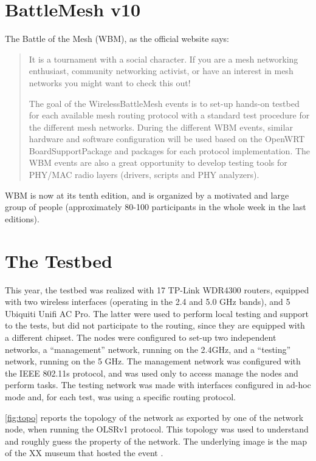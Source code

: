 \documentclass[10pt,onecolumn]{paper}
\begin{document}
\section{BattleMesh v10}
The Battle of the Mesh (WBM), as the official website says:
\begin{quote}
It is a tournament with a social character. If you are a mesh networking
enthusiast, community networking activist, or have an interest in mesh networks
you might want to check this out!

The goal of the WirelessBattleMesh events is to set-up hands-on testbed for each
available mesh routing protocol with a standard test procedure for the different
mesh networks. During the different WBM events, similar hardware and software
configuration will be used based on the OpenWRT BoardSupportPackage and packages
for each protocol implementation. The WBM events are also a great opportunity to
develop testing tools for PHY/MAC radio layers (drivers, scripts and PHY
analyzers).
\end{quote}

WBM is now at its tenth edition, and is organized by a motivated and large group
of people (approximately 80-100 participants in the whole week in the last
editions). 

\section{The Testbed}
This year, the testbed was realized with 17 TP-Link WDR4300 routers, equipped
with two wireless interfaces (operating in the 2.4 and 5.0 GHz bands), and 5
Ubiquiti Unifi AC Pro. The latter were used to perform local testing and support
to the tests, but did not participate to the routing, since they are equipped
with a different chipset. The nodes were configured to set-up two independent
networks, a ``management'' network, running on the 2.4GHz, and a ``testing''
network, running on the 5 GHz. The management network was configured with the
IEEE 802.11s protocol, and was used only to access manage the nodes and perform
tasks. The testing network was made with interfaces configured in ad-hoc mode
and, for each test, was using a specific routing protocol. 

\cref{fig:topo} reports the topology of the network as exported by one of the
network node, when running the OLSRv1 protocol. This topology was used to
understand and roughly guess the property of the network. The underlying image
is the map of the XX museum that hosted the event .
\end{document}
